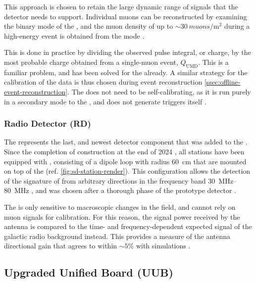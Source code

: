 This approach is chosen to retain the large dynamic range of signals that the 
detector needs to support. Individual muons can be reconstructed by examining
the binary mode of the \UMD, and the muon density of up to 
$\sim\SI{30}{muons\per\meter\squared} $ during a high-energy \EAS event is 
obtained from the \ADC mode \cite{bottiStatusPerformanceUnderground2022}.

This is done in practice by dividing the observed pulse integral, or charge, by
the most probable charge obtained from a single-muon event, $Q_\mathrm{UMD}$. 
This is a familiar problem, and has been solved for the \WCD already. A similar
strategy for the calibration of the \UMD \EAS data is thus chosen during event 
reconstruction \cref{ssec:offline-event-reconstruction}. The \UMD does not need 
to be self-calibrating, as it is run purely in a secondary mode to the \WCD, and
does not generate triggers itself \cite{aabCalibrationUndergroundMuon2021}.

\subsubsection{Radio Detector (RD)}
\label{sssec:rd}

The \RD represents the last, and newest detector component that was added to the
\SD. Since the completion of construction at the end of 2024 
\cite{castellinaSeasonalGreetings202424}, all \SD stations have been equipped
with \SALLAs, consisting of a dipole loop with radius \SI{60}{\centi\meter} that
are mounted on top of the \SSD (ref. \cref{fig:sd-station-render}). This 
configuration allows the detection of the \EM signature of \EASs from arbitrary 
directions in the frequency band 
\SIrange[range-units = single]{30}{80}{\mega\hertz} 
\cite{pontLargeRadioDetector2021}, and was chosen after a thorough \RND phase of
the \AERA prototype detector \cite{aabPierreAugerObservatory2020, 
fuchsAugerEngineeringRadio2012, aabEnergyEstimationCosmic2016}.

The \RD is only sensitive to macroscopic changes in the \EM field, and cannot 
rely on muon signals for calibration. For this reason, the signal power received
by the antenna is compared to the time- and frequency-dependent expected signal 
of the galactic radio background instead. This provides a measure of the antenna
directional gain that agrees to within $\sim5\%$ with simulations 
\cite{huegeRadioDetectorPierre2023, fodranFirstResultsAugerPrime2022}.

\subsection{Upgraded Unified Board (UUB)}
\label{ssec:uub}

